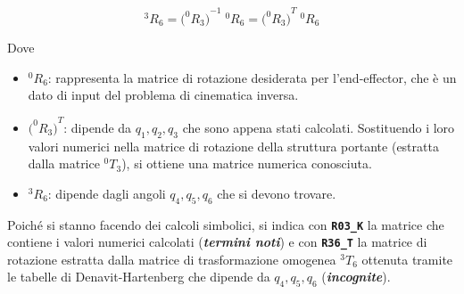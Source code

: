 \documentclass[11pt, a4paper]{article}
\begin{document}
\[
    ^3 R_6 ={\bigl(^0 R_3 \bigr)}^{-1} \;^0 R_6 ={\bigl(^0 R_3 \bigr)}^T \;^0 R_6
\]
\begin{par}
\begin{flushleft}
Dove
\end{flushleft}
\end{par}
\begin{itemize}

   \item{\begin{flushleft} $^0 R_6$: rappresenta la matrice di rotazione desiderata per l'end-effector, che è un dato di input del problema di cinematica inversa. \end{flushleft}}
   \item{\begin{flushleft} ${\bigl(^0 R_3 \bigr)}^T$: dipende da $q_1 ,q_2 ,q_3$ che sono appena stati calcolati. Sostituendo i loro valori numerici nella matrice di rotazione della struttura portante (estratta dalla matrice $^0 T_3$), si ottiene una matrice numerica conosciuta. \end{flushleft}}
   \item{\begin{flushleft} $^3 R_6$: dipende dagli angoli $q_4 ,q_5 ,q_6$  che si devono trovare. \end{flushleft}}
\end{itemize}
\newpage
\begin{par}
\begin{flushleft}
Poiché si stanno facendo dei calcoli simbolici, si indica con \texttt{\textbf{R03\_K}} la matrice che contiene i valori numerici calcolati (\textit{\textbf{termini noti}}) e con \texttt{\textbf{R36\_T}} la matrice di rotazione estratta dalla matrice di trasformazione omogenea $^3 T_6$ ottenuta tramite le tabelle di Denavit-Hartenberg che dipende da $q_4 ,q_5 ,q_6$ (\textit{\textbf{incognite}}).
\end{flushleft}
\end{par}
\end{document}

